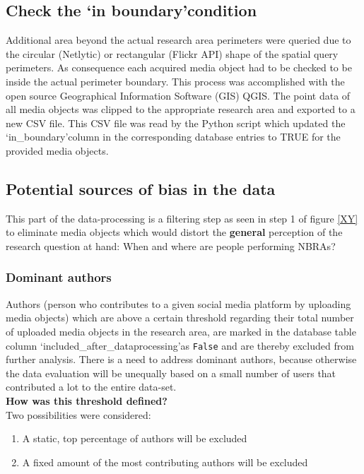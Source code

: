 \subsection{Check the \lq in boundary\rq condition} \label{in_boundary}
Additional area beyond the actual research area perimeters were queried due to the circular (Netlytic) or rectangular (Flickr API) shape of the spatial query perimeters. As consequence each acquired media object had to be checked to be inside the actual perimeter boundary. This process was accomplished with the open source Geographical Information Software (GIS) QGIS. The point data of all media objects was clipped to the appropriate research area and exported to a new CSV file. This CSV file was read by the Python script which updated the \lq in\_boundary\rq column in the corresponding database entries to TRUE for the provided media objects.

\subsection{Potential sources of bias in the data} \label{sources_data_bias}
This part of the data-processing is a filtering step as seen in step 1 of figure \ref{XY} to eliminate media objects which would distort the \textbf{general} perception of the research question at hand: When and where are people performing NBRAs?

\subsubsection{Dominant authors} \label{bias_dominant_authors}
Authors (person who contributes to a given social media platform by uploading media objects) which are above a certain threshold regarding their total number of uploaded media objects in the research area, are marked in the database table column \lq included\_after\_dataprocessing\rq as \texttt{False} and are thereby excluded from further analysis. There is a need to address dominant authors, because otherwise the data evaluation will be unequally based on a small number of users that contributed a lot to the entire data-set.\\
\newline
\textbf{How was this threshold defined?}\\
\newline
Two possibilities were considered:
\begin{enumerate}
  \item A static, top percentage of authors will be excluded
  \item A fixed amount of the most contributing authors will be excluded
\end{enumerate}

